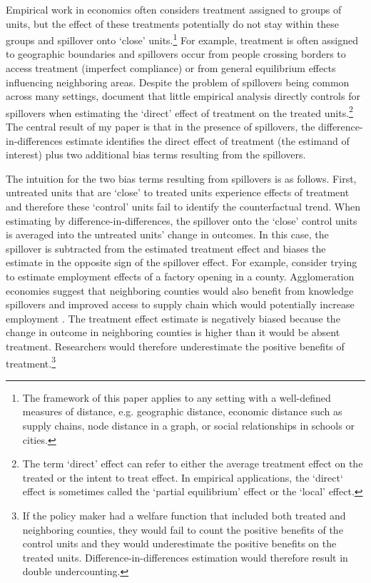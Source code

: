 \documentclass[11pt]{article}
\begin{document}
Empirical work in economics often considers treatment assigned to groups of units, but the effect of these treatments potentially do not stay within these groups and spillover onto ‘close’ units.\footnote{The framework of this paper applies to any setting with a well-defined measures of distance, e.g. geographic
distance, economic distance such as supply chains, node distance in a graph, or social relationships in schools or cities.} For example, treatment is often assigned to geographic boundaries and spillovers occur from people crossing borders to access treatment (imperfect compliance) or from general equilibrium effects influencing neighboring areas. Despite the problem of spillovers being common across many settings, \citet{Berg_Streitz_2019} document that little empirical analysis directly controls for spillovers when estimating the `direct' effect of treatment on the treated units.\footnote{The term `direct' effect can refer to either the average treatment effect on the treated or the intent to treat effect. In empirical applications, the `direct` effect is sometimes called the `partial equilibrium' effect or the `local' effect.} The central result of my paper is that in the presence of spillovers, the difference-in-differences estimate identifies the direct effect of treatment (the estimand of interest) plus two additional bias terms resulting from the spillovers.

The intuition for the two bias terms resulting from spillovers is as follows. First, untreated units that are `close' to treated units experience effects of treatment and therefore these `control' units fail to identify the counterfactual trend. When estimating by difference-in-differences, the spillover onto the `close' control units is averaged into the untreated units' change in outcomes. In this case, the spillover is subtracted from the estimated treatment effect and biases the estimate in the opposite sign of the spillover effect. For example, consider trying to estimate employment effects of a factory opening in a county. Agglomeration economies suggest that neighboring counties would also benefit from knowledge spillovers and improved access to supply chain which would potentially increase employment \citep{Duranton_Puga_2003}. The treatment effect estimate is negatively biased because the change in outcome in neighboring counties is higher than it would be absent treatment. Researchers would therefore underestimate the positive benefits of treatment.\footnote{If the policy maker had a welfare function that included both treated and neighboring counties, they would fail to count the positive benefits of the control units and they would underestimate the positive benefits on the treated units. Difference-in-differences estimation would therefore result in double undercounting.}
\end{document}
